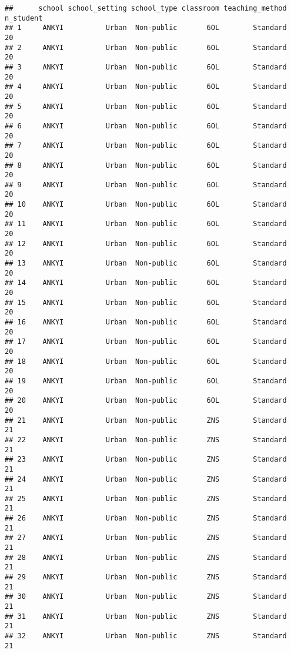 \documentclass[
]{article}
\begin{document}
\begin{verbatim}
##      school school_setting school_type classroom teaching_method n_student
## 1     ANKYI          Urban  Non-public       6OL        Standard        20
## 2     ANKYI          Urban  Non-public       6OL        Standard        20
## 3     ANKYI          Urban  Non-public       6OL        Standard        20
## 4     ANKYI          Urban  Non-public       6OL        Standard        20
## 5     ANKYI          Urban  Non-public       6OL        Standard        20
## 6     ANKYI          Urban  Non-public       6OL        Standard        20
## 7     ANKYI          Urban  Non-public       6OL        Standard        20
## 8     ANKYI          Urban  Non-public       6OL        Standard        20
## 9     ANKYI          Urban  Non-public       6OL        Standard        20
## 10    ANKYI          Urban  Non-public       6OL        Standard        20
## 11    ANKYI          Urban  Non-public       6OL        Standard        20
## 12    ANKYI          Urban  Non-public       6OL        Standard        20
## 13    ANKYI          Urban  Non-public       6OL        Standard        20
## 14    ANKYI          Urban  Non-public       6OL        Standard        20
## 15    ANKYI          Urban  Non-public       6OL        Standard        20
## 16    ANKYI          Urban  Non-public       6OL        Standard        20
## 17    ANKYI          Urban  Non-public       6OL        Standard        20
## 18    ANKYI          Urban  Non-public       6OL        Standard        20
## 19    ANKYI          Urban  Non-public       6OL        Standard        20
## 20    ANKYI          Urban  Non-public       6OL        Standard        20
## 21    ANKYI          Urban  Non-public       ZNS        Standard        21
## 22    ANKYI          Urban  Non-public       ZNS        Standard        21
## 23    ANKYI          Urban  Non-public       ZNS        Standard        21
## 24    ANKYI          Urban  Non-public       ZNS        Standard        21
## 25    ANKYI          Urban  Non-public       ZNS        Standard        21
## 26    ANKYI          Urban  Non-public       ZNS        Standard        21
## 27    ANKYI          Urban  Non-public       ZNS        Standard        21
## 28    ANKYI          Urban  Non-public       ZNS        Standard        21
## 29    ANKYI          Urban  Non-public       ZNS        Standard        21
## 30    ANKYI          Urban  Non-public       ZNS        Standard        21
## 31    ANKYI          Urban  Non-public       ZNS        Standard        21
## 32    ANKYI          Urban  Non-public       ZNS        Standard        21

\end{verbatim}
\end{document}
